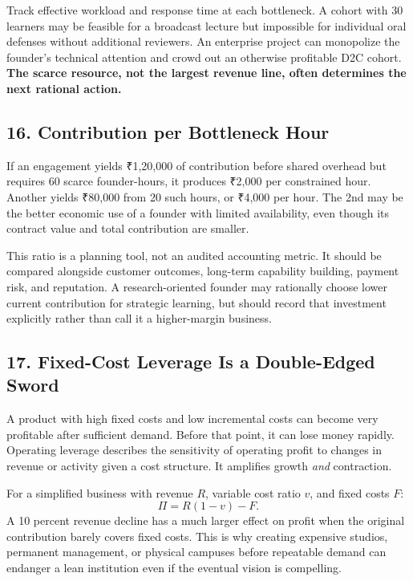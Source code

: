 Track effective workload and response time at each bottleneck. A cohort with 30 learners may be feasible for a broadcast lecture but impossible for individual oral defenses without additional reviewers. An enterprise project can monopolize the founder's technical attention and crowd out an otherwise profitable D2C cohort. \textbf{The scarce resource, not the largest revenue line, often determines the next rational action.}

\subsection*{16. Contribution per Bottleneck Hour}

If an engagement yields ₹1,20,000 of contribution before shared overhead but requires 60 scarce founder-hours, it produces ₹2,000 per constrained hour. Another yields ₹80,000 from 20 such hours, or ₹4,000 per hour. The 2nd may be the better economic use of a founder with limited availability, even though its contract value and total contribution are smaller.

This ratio is a planning tool, not an audited accounting metric. It should be compared alongside customer outcomes, long-term capability building, payment risk, and reputation. A research-oriented founder may rationally choose lower current contribution for strategic learning, but should record that investment explicitly rather than call it a higher-margin business.

\subsection*{17. Fixed-Cost Leverage Is a Double-Edged Sword}

A product with high fixed costs and low incremental costs can become very profitable after sufficient demand. Before that point, it can lose money rapidly. Operating leverage describes the sensitivity of operating profit to changes in revenue or activity given a cost structure. It amplifies growth \emph{and} contraction.

For a simplified business with revenue $R$, variable cost ratio $v$, and fixed costs $F$:
\begin{equation}
\Pi = R(1 - v) - F.
\end{equation}
A 10 percent revenue decline has a much larger effect on profit when the original contribution barely covers fixed costs. This is why creating expensive studios, permanent management, or physical campuses before repeatable demand can endanger a lean institution even if the eventual vision is compelling.
